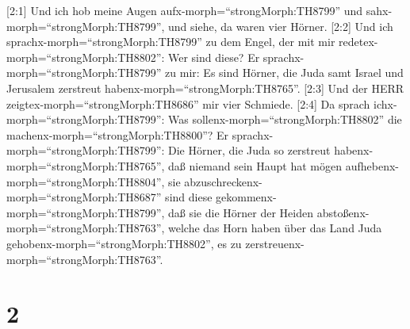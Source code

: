 {[}2:1{]} Und ich hob meine Augen aufx-morph=``strongMorph:TH8799'' und
sahx-morph=``strongMorph:TH8799'', und siehe, da waren vier Hörner.
 {[}2:2{]} Und ich sprachx-morph=``strongMorph:TH8799'' zu
dem Engel, der mit mir redetex-morph=``strongMorph:TH8802'': Wer sind
diese? Er sprachx-morph=``strongMorph:TH8799'' zu mir: Es sind Hörner,
die Juda samt Israel und Jerusalem zerstreut
habenx-morph=``strongMorph:TH8765''.  {[}2:3{]} Und der
HERR zeigtex-morph=``strongMorph:TH8686'' mir vier Schmiede.
 {[}2:4{]} Da sprach ichx-morph=``strongMorph:TH8799'': Was
sollenx-morph=``strongMorph:TH8802'' die
machenx-morph=``strongMorph:TH8800''? Er
sprachx-morph=``strongMorph:TH8799'': Die Hörner, die Juda so zerstreut
habenx-morph=``strongMorph:TH8765'', daß niemand sein Haupt hat mögen
aufhebenx-morph=``strongMorph:TH8804'', sie
abzuschreckenx-morph=``strongMorph:TH8687'' sind diese
gekommenx-morph=``strongMorph:TH8799'', daß sie die Hörner der Heiden
abstoßenx-morph=``strongMorph:TH8763'', welche das Horn haben über das
Land Juda gehobenx-morph=``strongMorph:TH8802'', es zu
zerstreuenx-morph=``strongMorph:TH8763''.

\hypertarget{section-1}{%
\section{2}\label{section-1}}

